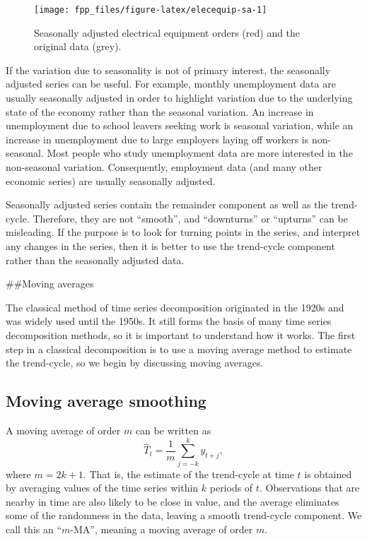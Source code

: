 \documentclass[]{book}
\begin{document}
\begin{figure}

{\centering \texttt{[image: fpp\_files/figure-latex/elecequip-sa-1]} 

}

\caption{Seasonally adjusted electrical equipment orders (red) and the original data (grey).}\label{fig:elecequip-sa}
\end{figure}

If the variation due to seasonality is not of primary interest, the seasonally adjusted series can be useful. For example, monthly unemployment data are usually seasonally adjusted in order to highlight variation due to the underlying state of the economy rather than the seasonal variation. An increase in unemployment due to school leavers seeking work is seasonal variation, while an increase in unemployment due to large employers laying off workers is non-seasonal. Most people who study unemployment data are more interested in the non-seasonal variation. Consequently, employment data (and many other economic series) are usually seasonally adjusted.

Seasonally adjusted series contain the remainder component as well as the trend-cycle. Therefore, they are not ``smooth'', and ``downturns'' or ``upturns'' can be misleading. If the purpose is to look for turning points in the series, and interpret any changes in the series, then it is better to use the trend-cycle component rather than the seasonally adjusted data.

\#\#Moving averages

The classical method of time series decomposition originated in the 1920s and was widely used until the 1950s. It still forms the basis of many time series decomposition methods, so it is important to understand how it works. The first step in a classical decomposition is to use a moving average method to estimate the trend-cycle, so we begin by discussing moving averages.

\hypertarget{moving-average-smoothing}{%
\subsection*{Moving average smoothing}\label{moving-average-smoothing}}

A moving average of order \(m\) can be written as
\[
  \hat{T}_{t} = \frac{1}{m} \sum_{j=-k}^k y_{t+j},
\]
where \(m=2k+1\). That is, the estimate of the trend-cycle at time \(t\) is obtained by averaging values of the time series within \(k\) periods of \(t\). Observations that are nearby in time are also likely to be close in value, and the average eliminates some of the randomness in the data, leaving a smooth trend-cycle component. We call this an ``\(m\)-MA'', meaning a moving average of order \(m\).
\end{document}

